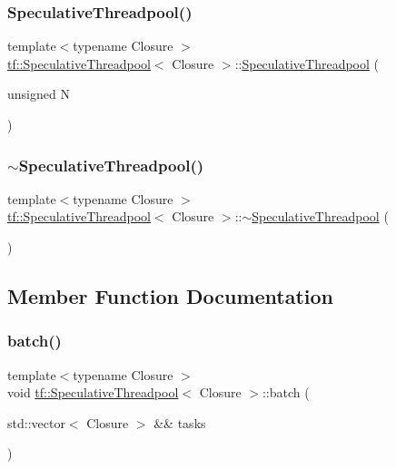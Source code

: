 \subsubsection{\texorpdfstring{Speculative\+Threadpool()}{SpeculativeThreadpool()}}
{\footnotesize\ttfamily template$<$typename Closure $>$ \\
\hyperlink{classtf_1_1SpeculativeThreadpool}{tf\+::\+Speculative\+Threadpool}$<$ Closure $>$\+::\hyperlink{classtf_1_1SpeculativeThreadpool}{Speculative\+Threadpool} (\begin{DoxyParamCaption}\item[{unsigned}]{N }\end{DoxyParamCaption})}

\mbox{\label{classtf_1_1SpeculativeThreadpool_a416d633cf5fa67c853473a4114fd51e8}} 
\subsubsection{\texorpdfstring{$\sim$\+Speculative\+Threadpool()}{~SpeculativeThreadpool()}}
{\footnotesize\ttfamily template$<$typename Closure $>$ \\
\hyperlink{classtf_1_1SpeculativeThreadpool}{tf\+::\+Speculative\+Threadpool}$<$ Closure $>$\+::$\sim$\hyperlink{classtf_1_1SpeculativeThreadpool}{Speculative\+Threadpool} (\begin{DoxyParamCaption}{ }\end{DoxyParamCaption})}



\subsection{Member Function Documentation}
\mbox{\label{classtf_1_1SpeculativeThreadpool_aaf6fb1ab187875987560b61e5b85f8f2}} 
\subsubsection{\texorpdfstring{batch()}{batch()}}
{\footnotesize\ttfamily template$<$typename Closure $>$ \\
void \hyperlink{classtf_1_1SpeculativeThreadpool}{tf\+::\+Speculative\+Threadpool}$<$ Closure $>$\+::batch (\begin{DoxyParamCaption}\item[{std\+::vector$<$ Closure $>$ \&\&}]{tasks }\end{DoxyParamCaption})}

